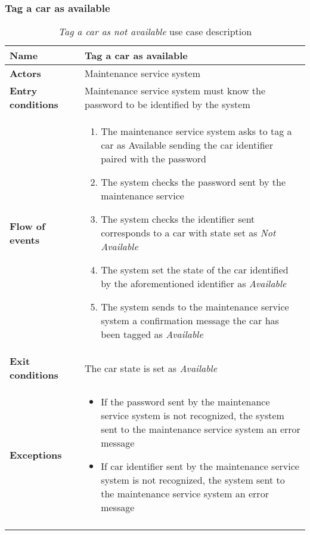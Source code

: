 \subsubsection{Tag a car as available}
\begin{longtable}{p{0.25\linewidth}p{0.75\linewidth}}
\toprule
\textbf{Name} & \textbf{Tag a car as available} \\
\midrule
\textbf{Actors} &  Maintenance service system\\
\midrule
\textbf{Entry conditions} & Maintenance service system must know the password to be identified by the system\\
\midrule
\textbf{Flow of events} & 
\begin{enumerate}
	\item The maintenance service system asks to tag a car as Available sending the car identifier
	paired with the password
	\item The system checks the password sent by the maintenance service
	\item The system checks the identifier sent corresponds to a car with state set as \emph{Not Available}
	\item The system set the state of the car identified by the aforementioned identifier as \emph{Available}
	\item The system sends to the maintenance service system a confirmation message the car has been tagged as \emph{Available}
\end{enumerate} \\
\midrule
\textbf{Exit conditions} & The car state is set as \emph{Available} \\
\midrule
\textbf{Exceptions} & 
\begin{itemize}
	\item If the password sent by the maintenance service system is not recognized, the system sent to the maintenance service system an error message
	\item If car identifier sent by the maintenance service system is not recognized, the system sent to the maintenance service system an error message
\end{itemize} \\
\bottomrule
\caption{\emph{Tag a car as not available} use case description}
\end{longtable}

\clearpage
